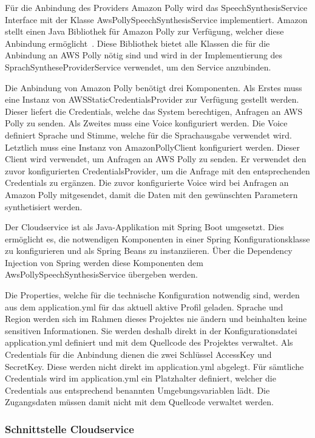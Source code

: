Für die Anbindung des Providers Amazon Polly wird das SpeechSynthesisService Interface mit der Klasse AwsPollySpeechSynthesisService implementiert.
Amazon stellt einen Java Bibliothek für Amazon Polly zur Verfügung, welcher diese Anbindung ermöglicht~\cite{aws_polly_sdks}.
Diese Bibliothek bietet alle Klassen die für die Anbindung an AWS Polly nötig sind und wird in der Implementierung des SprachSyntheseProviderService verwendet, um den Service anzubinden.

Die Anbindung von Amazon Polly benötigt drei Komponenten.
Als Erstes muss eine Instanz von AWSStaticCredentialsProvider zur Verfügung gestellt werden.
Dieser liefert die Credentials, welche das System berechtigen, Anfragen an AWS Polly zu senden.
Als Zweites muss eine Voice konfiguriert werden.
Die Voice definiert Sprache und Stimme, welche für die Sprachausgabe verwendet wird.
Letztlich muss eine Instanz von AmazonPollyClient konfiguriert werden.
Dieser Client wird verwendet, um Anfragen an AWS Polly zu senden.
Er verwendet den zuvor konfigurierten CredentialsProvider, um die Anfrage mit den entsprechenden Credentials zu ergänzen.
Die zuvor konfigurierte Voice wird bei Anfragen an Amazon Polly mitgesendet, damit die Daten mit den gewünschten Parametern synthetisiert werden.

Der Cloudservice ist als Java-Applikation mit Spring Boot umgesetzt.
Dies ermöglicht es, die notwendigen Komponenten in einer Spring Konfigurationsklasse zu konfigurieren und als Spring Beans zu instanziieren.
Über die Dependency Injection von Spring werden diese Komponenten dem AwsPollySpeechSynthesisService übergeben werden.

Die Properties, welche für die technische Konfiguration notwendig sind, werden aus dem application.yml für das aktuell aktive Profil geladen.
Sprache und Region werden sich im Rahmen dieses Projektes nie ändern und beinhalten keine sensitiven Informationen.
Sie werden deshalb direkt in der Konfigurationsdatei application.yml definiert und mit dem Quellcode des Projektes verwaltet.
Als Credentials für die Anbindung dienen die zwei Schlüssel AccessKey und SecretKey.
Diese werden nicht direkt im application.yml abgelegt.
Für sämtliche Credentials wird im application.yml ein Platzhalter definiert, welcher die Credentials aus entsprechend benannten Umgebungsvariablen lädt.
Die Zugangsdaten müssen damit nicht mit dem Quellcode verwaltet werden.

\subsubsection{Schnittstelle Cloudservice}


